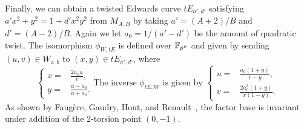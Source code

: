 Finally, we can obtain a twisted Edwards curve $tE_{a',d'}$ satisfying
$a'x^2 + y^2 = 1 + d'x^2y^2$ from $M_{A,B}$ by taking $a' = (A + 2)/B$
and $d' = (A - 2)/B$.
%
Again we let $a_0=1/(a' - d')$ be the amount of quadratic twist.
%
The isomorphism $\phi_{W,tE}$ is defined over $\mathbb F_{p^n}$ and given by
sending $(u,v)\in W_{a,b}$ to $(x,y)\in tE_{a',d'}$, where
\[ \left\{\begin{aligned}
      x = & \frac{2a_0u}{v}, \\
      y = & \frac{u - a_0}{u + a_0}.
    \end{aligned}\right. \text{The inverse $\phi_{tE,W}$ is given by }
  \left\{\begin{aligned}
      u = & \frac{a_0(1 + y)}{1 - y}, \\
      v = & \frac{2a_0^2(1 + y)}{x(1 - y)}.
    \end{aligned}\right. \]
% 
As shown by Faug\`ere, Gaudry, Hout, and
Renault~\cite{DBLP:journals/joc/FaugereGHR14}, the factor base is
invariant under addition of the 2-torsion point $(0,-1)$.
